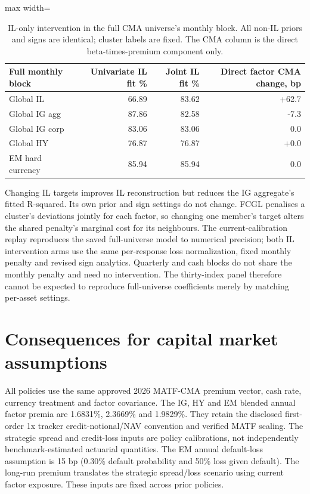 \documentclass[a4paper,review]{cas-sc}
\begin{document}
\begin{table}[pos=htbp]
\centering
\small
\caption{IL-only intervention in the full CMA universe's monthly block. All non-IL priors and signs are identical; cluster labels are fixed. The CMA column is the direct beta-times-premium component only.}
\begin{adjustbox}{max width=\linewidth}
\begin{tabular}{lrrr}
\toprule
Full monthly block & Univariate IL fit \% & Joint IL fit \% & Direct factor CMA change, bp \\
\midrule
Global IL & 66.89 & 83.62 & +62.7 \\
Global IG agg & 87.86 & 82.58 & -7.3 \\
Global IG corp & 83.06 & 83.06 & 0.0 \\
Global HY & 76.87 & 76.87 & +0.0 \\
EM hard currency & 85.94 & 85.94 & 0.0 \\
\bottomrule
\end{tabular}
\end{adjustbox}
\end{table}

Changing IL targets improves IL reconstruction but reduces the IG aggregate's fitted R-squared. Its own prior and sign settings do not change. FCGL penalises a cluster's deviations jointly for each factor, so changing one member's target alters the shared penalty's marginal cost for its neighbours. The current-calibration replay reproduces the saved full-universe model to numerical precision; both IL intervention arms use the same per-response loss normalization, fixed monthly penalty and revised sign analytics. Quarterly and cash blocks do not share the monthly penalty and need no intervention. The thirty-index panel therefore cannot be expected to reproduce full-universe coefficients merely by matching per-asset settings.

\section{Consequences for capital market assumptions}

All policies use the same approved 2026 MATF-CMA premium vector, cash rate, currency treatment and factor covariance. The IG, HY and EM blended annual factor premia are 1.6831\%, 2.3669\% and 1.9829\%. They retain the disclosed first-order 1x tracker credit-notional/NAV convention and verified MATF scaling. The strategic spread and credit-loss inputs are policy calibrations, not independently benchmark-estimated actuarial quantities. The EM annual default-loss assumption is 15 bp (0.30\% default probability and 50\% loss given default). The long-run premium translates the strategic spread/loss scenario using current factor exposure. These inputs are fixed across prior policies.
\end{document}
